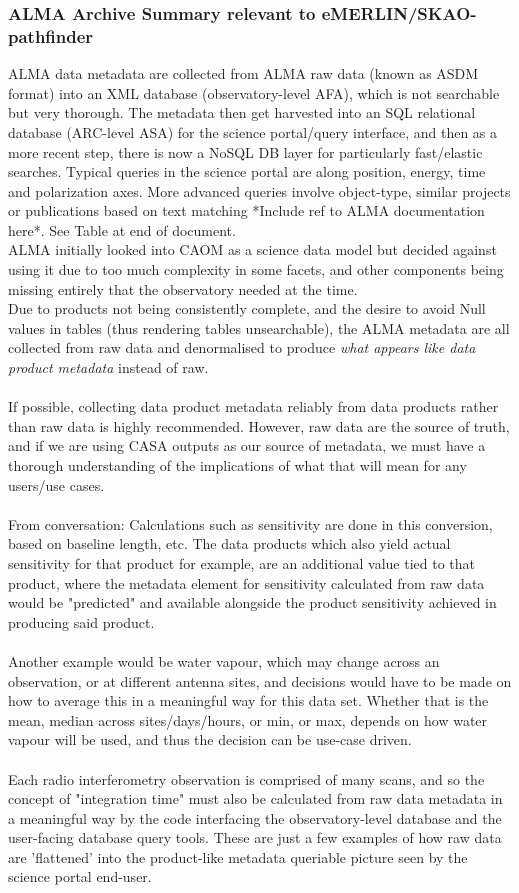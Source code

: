 \subsubsection{ALMA Archive Summary relevant to eMERLIN/SKAO-pathfinder}
ALMA data metadata are collected from ALMA raw data (known as ASDM format) into an XML database (observatory-level AFA), which is not searchable but very thorough.   The metadata then get harvested into an SQL relational database (ARC-level ASA) for the science portal/query interface, and then as a more recent step, there is now a NoSQL DB layer for particularly fast/elastic searches.  Typical queries in the science portal are along position, energy, time and polarization axes.  More advanced queries involve object-type, similar projects or publications based on text matching *Include ref to ALMA documentation here*.
See Table at end of document.
\\
ALMA initially looked into CAOM as a science data model but decided against using it due to too much complexity in some facets, and other components being missing entirely that the observatory needed at the time.  
\\
Due to products not being consistently complete, and the desire to avoid Null values in tables (thus rendering tables unsearchable), the ALMA metadata are all collected from raw data and denormalised to produce \textit{what appears like data product metadata} instead of raw. \\
\\
If possible, collecting data product metadata reliably from data products rather than raw data is highly recommended.  However, raw data are the source of truth, and if we are using CASA outputs as our source of metadata, we must have a thorough understanding of the implications of what that will mean for any users/use cases.   \\  
\\
From conversation: Calculations such as sensitivity are done in this conversion, based on baseline length, etc.  The data products which also yield actual sensitivity for that product for example, are an additional value tied to that product, where the metadata element for sensitivity calculated from raw data would be "predicted" and available alongside the product sensitivity achieved in producing said product.  \\
\\
Another example would be water vapour, which may change across an observation, or at different antenna sites, and decisions would have to be made on how to average this in a meaningful way for this data set.  Whether that is the mean, median across sites/days/hours, or min, or max, depends on how water vapour will be used, and thus the decision can be use-case driven.\\
\\
Each radio interferometry observation is comprised of many scans, and so the concept of "integration time" must also be calculated from raw data metadata in a meaningful way by the code interfacing the observatory-level database and the user-facing database query tools.  These are just a few examples of how raw data are 'flattened' into the product-like metadata queriable picture seen by the science portal end-user.  

